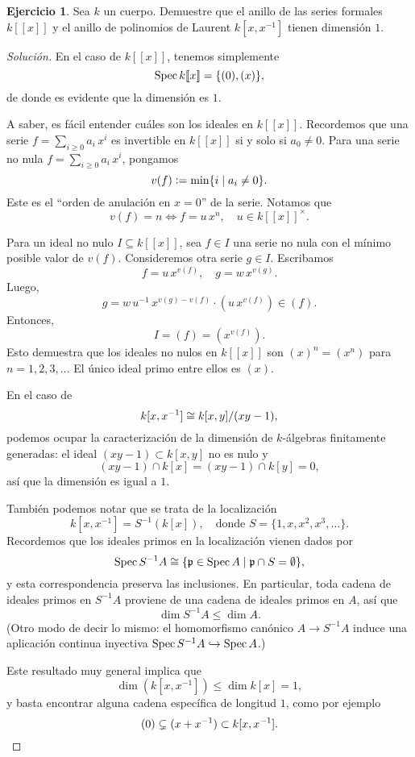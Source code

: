 \documentclass{article}
\theoremstyle{definition}
\newtheorem{ejerc}{Ejercicio}
\newenvironment{solucion}{\begin{proof}[Solución]}{\end{proof}}
\begin{document}
\begin{ejerc}
  Sea $k$ un cuerpo. Demuestre que el anillo de las series formales
  $k [\![x]\!]$ y el anillo de polinomios de Laurent $k [x,x^{-1}]$ tienen
  dimensión $1$.

  \ifdefined\solutions\begin{solucion}
    En el caso de $k [\![x]\!]$, tenemos simplemente
    $$\operatorname{Spec} k [\![x]\!] = \{ (0), (x) \},$$
    de donde es evidente que la dimensión es $1$.

    A saber, es fácil entender cuáles son los ideales en $k
    [\![x]\!]$. Recordemos que una serie $f = \sum_{i\ge 0} a_i\,x^i$ es
    invertible en $k [\![x]\!]$ si y solo si $a_0 \ne 0$.
    Para una serie no nula $f = \sum_{i\ge 0} a_i\,x^i$, pongamos
    $$v (f) \mathrel{\mathop:}= \min \{ i \mid a_i \ne 0 \}.$$
    Este es el ``orden de anulación en $x=0$'' de la serie. Notamos que
    $$v (f) = n \iff f = u\,x^n, \quad u \in k [\![x]\!]^\times.$$

    Para un ideal no nulo $I \subseteq k [\![x]\!]$, sea $f \in I$ una serie no
    nula con el mínimo posible valor de $v (f)$. Consideremos otra serie
    $g \in I$. Escribamos
    $$f = u\,x^{v (f)}, \quad g = w\,x^{v (g)}.$$
    Luego,
    $$g = w\,u^{-1}\,x^{v (g) - v (f)} \cdot (u\,x^{v (f)}) \in (f).$$
    Entonces,
    $$I = (f) = (x^{v (f)}).$$
    Esto demuestra que los ideales no nulos en $k [\![x]\!]$ son $(x)^n = (x^n)$
    para $n = 1,2,3,\ldots$ El único ideal primo entre ellos es $(x)$.

    \vspace{1em}

    En el caso de
    $$k [x,x^{-1}] \cong k [x,y] / (xy-1),$$
    podemos ocupar la caracterización de la dimensión de $k$-álgebras
    finitamente generadas: el ideal $(xy-1) \subset k [x,y]$ no es nulo y
    $$(xy-1) \cap k[x] = (xy-1) \cap k [y] = 0,$$
    así que la dimensión es igual a $1$.

    \vspace{1em}

    También podemos notar que se trata de la localización
    \[ k [x,x^{-1}] = S^{-1} (k [x]), \quad
       \text{donde } S = \{ 1, x, x^2, x^3, \ldots \}.\]
    Recordemos que los ideales primos en la localización vienen dados por
    \[ \operatorname{Spec} S^{-1} A \cong
       \{ \mathfrak{p} \in \operatorname{Spec} A \mid \mathfrak{p} \cap S = \emptyset \}, \]
    y esta correspondencia preserva las inclusiones. En particular, toda cadena
    de ideales primos en $S^{-1} A$ proviene de una cadena de ideales primos en
    $A$, así que
    $$\dim S^{-1} A \le \dim A.$$
    (Otro modo de decir lo mismo: el homomorfismo canónico $A \to S^{-1} A$
    induce una aplicación continua inyectiva
    $\operatorname{Spec} S^{-1} A \hookrightarrow \operatorname{Spec} A$.)

    Este resultado muy general implica que
    $$\dim (k [x,x^{-1}]) \le \dim k [x] = 1,$$
    y basta encontrar alguna cadena específica de longitud $1$, como por ejemplo
    \[ (0) \subsetneq (x + x^{-1}) \subset k [x,x^{-1}]. \qedhere \]
  \end{solucion}\fi
\end{ejerc}
\end{document}
